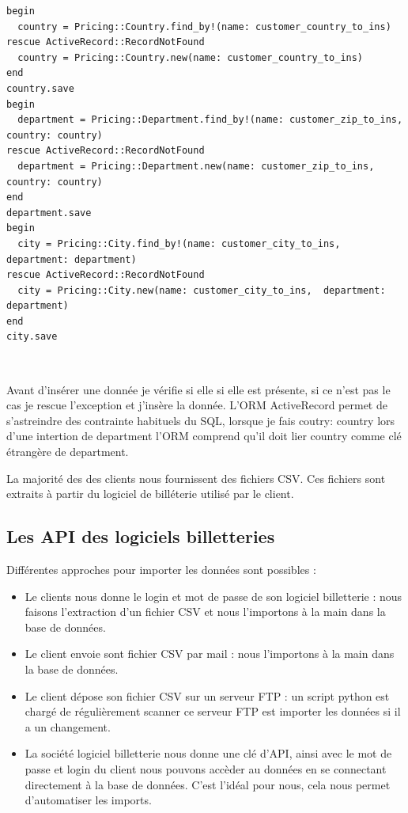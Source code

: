 \lstset{style=customruby}
\begin{lstlisting}
begin
  country = Pricing::Country.find_by!(name: customer_country_to_ins)
rescue ActiveRecord::RecordNotFound 
  country = Pricing::Country.new(name: customer_country_to_ins)
end
country.save
begin
  department = Pricing::Department.find_by!(name: customer_zip_to_ins, country: country)
rescue ActiveRecord::RecordNotFound
  department = Pricing::Department.new(name: customer_zip_to_ins,  country: country)
end
department.save
begin
  city = Pricing::City.find_by!(name: customer_city_to_ins, department: department)
rescue ActiveRecord::RecordNotFound
  city = Pricing::City.new(name: customer_city_to_ins,  department: department)
end
city.save
\end{lstlisting}
\leavevmode \

Avant d'insérer une donnée je vérifie si elle si elle est présente, si ce n'est pas le cas je rescue l'exception et j'insère la donnée. 
L'ORM ActiveRecord permet de s'astreindre des contrainte habituels du SQL, lorsque je fais coutry: country lors d'une intertion de department l'ORM comprend qu'il doit lier country comme clé étrangère de department.

La majorité des des clients nous fournissent des fichiers CSV. Ces fichiers sont extraits à partir du logiciel de billéterie utilisé par le client.


\subsection{Les API des logiciels billetteries}
Différentes approches pour importer les données sont possibles : 
\begin{itemize}
  \item[\textbullet] Le clients nous donne le login et mot de passe de son logiciel billetterie : nous faisons l'extraction d'un fichier CSV et nous l'importons à la main dans la base de données. 
  \item[\textbullet] Le client envoie sont fichier CSV par mail : nous l'importons à la main dans la base de données.
  \item[\textbullet] Le client dépose son fichier CSV sur un serveur FTP : un script python est chargé de régulièrement scanner ce serveur FTP est importer les données si il a un changement.
  \item[\textbullet] La société logiciel billetterie nous donne une clé d'API, ainsi avec le mot de passe et login du client nous pouvons accèder au données en se connectant directement à la base de données. C'est l'idéal pour nous, cela nous permet d'automatiser les imports.
\end{itemize}

